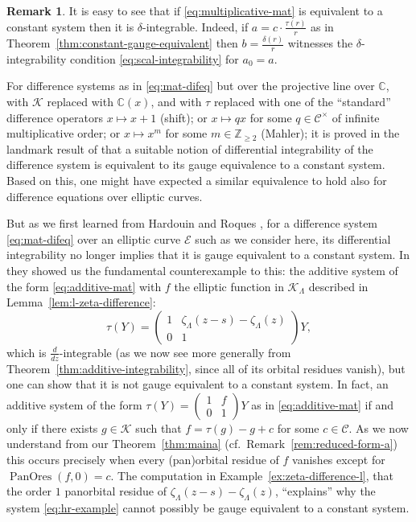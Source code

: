 \documentclass[preprint,12pt]{elsarticle}
\numberwithin{equation}{section} %
\theoremstyle{theorem}
\theoremstyle{definition}
\newtheorem{remark}[theorem]{Remark}
\newcommand{\Ca}{\mathcal{C}} %
\newcommand{\bk}{\mathcal{K}} %
\newcommand{\bkl}{\bk_{\Lambda}} %
\newcommand{\ec}{\mathcal{E}} %
\newcommand{\C}{\mathbb{C}} %
\newcommand{\Z}{\mathbb{Z}} %
\newcommand{\zl}{\zeta_{\Lambda}}
\DeclareMathOperator{\pano}{PanOres}
\begin{document}
\begin{remark}\label{rem:constant-gauge-equivalent}
    It is easy to see that if \eqref{eq:multiplicative-mat} is equivalent to a constant system then it is $\delta$-integrable. Indeed, if $a=c\cdot\frac{\tau(r)}{r}$ as in Theorem~\ref{thm:constant-gauge-equivalent} then $b=\frac{\delta(r)}{r}$ witnesses the $\delta$-integrability condition \eqref{eq:scal-integrability} for $a_0=a$. 
    
    For difference systems as in \eqref{eq:mat-difeq} but over the projective line over $\C$, with $\bk$ replaced with $\C(x)$, and with $\tau$ replaced with one of the ``standard'' difference operators $x\mapsto x+1$ (shift); or $x\mapsto qx$ for some $q\in\Ca^\times$ of infinite multiplicative order; or $x\mapsto x^m$ for some $m\in\Z_{\geq 2}$ (Mahler); it is proved in the landmark result of \cite{schaefke-singer:2019} that a suitable notion of differential integrability of the difference system is equivalent to its gauge equivalence to a constant system. Based on this, one might have expected a similar equivalence to hold also for difference equations over elliptic curves.
    
    But as we first learned from Hardouin and Roques \cite{hardouin-roques:2023}, for a difference system \eqref{eq:mat-difeq} over an elliptic curve $\ec$ such as we consider here, its differential integrability no longer implies that it is gauge equivalent to a constant system. In \cite{hardouin-roques:2023} they showed us the fundamental counterexample to this: the additive system of the form \eqref{eq:additive-mat} with $f$ the elliptic function in $\bkl$ described in Lemma~\ref{lem:l-zeta-difference}: \begin{equation}\label{eq:hr-example}\tau(Y)=\begin{pmatrix}
        1 & \zl(z-s)-\zl(z) \\ 0 & 1
    \end{pmatrix}Y,\end{equation} which is $\frac{d}{dz}$-integrable (as we now see more generally from Theorem~\ref{thm:additive-integrability}, since all of its orbital residues vanish), but one can show that it is not gauge equivalent to a constant system. In fact, an additive system of the form $\tau(Y)=\left(\begin{smallmatrix}1 & f \\ 0 & 1\end{smallmatrix}\right)Y$ as in \eqref{eq:additive-mat} if and only if there exists $g\in\bk$ such that $f=\tau(g)-g+c$ for some $c\in\Ca$. As we now understand from our Theorem~\ref{thm:maina} (cf.~Remark~\ref{rem:reduced-form-a}) this occurs precisely when every (pan)orbital residue of $f$ vanishes except for $\pano(f,0)=c$. The computation in Example~\ref{ex:zeta-difference-l}, that the order $1$ panorbital residue of $\zl(z-s)-\zl(z)$, ``explains'' why the system \eqref{eq:hr-example} cannot possibly be gauge equivalent to a constant system.
\end{remark}
\end{document}
